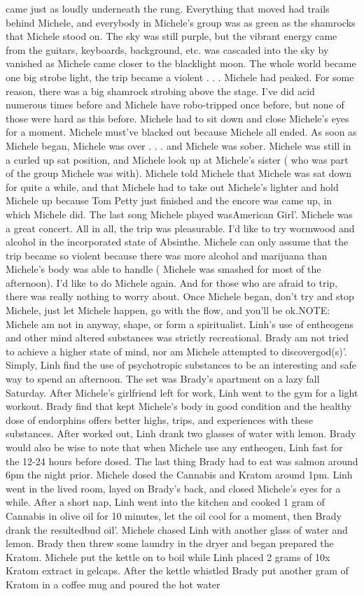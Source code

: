 \documentclass[12pt]{book}
\begin{document}
came just as loudly underneath the rung. Everything that moved had trails behind Michele, and everybody in Michele's group was as green as the shamrocks that Michele stood on. The sky was still purple, but the vibrant energy came from the guitars, keyboards, background, etc. was cascaded into the sky by vanished as Michele came closer to the blacklight moon. The whole world became one big strobe light, the trip became a violent . . .  Michele had peaked. For some reason, there was a big shamrock strobing above the stage. I've did acid numerous times before and Michele have robo-tripped once before, but none of those were hard as this before. Michele had to sit down and close Michele's eyes for a moment. Michele must've blacked out because Michele all ended. As soon as Michele began, Michele was over . . .  and Michele was sober. Michele was still in a curled up sat position, and Michele look up at Michele's sister ( who was part of the group Michele was with). Michele told Michele that Michele was sat down for quite a while, and that Michele had to take out Michele's lighter and hold Michele up because Tom Petty just finished and the encore was came up, in which Michele did. The last song Michele played wasAmerican Girl'. Michele was a great concert. All in all, the trip was pleasurable. I'd like to try wormwood and alcohol in the incorporated state of Absinthe. Michele can only assume that the trip became so violent because there was more alcohol and marijuana than Michele's body was able to handle ( Michele was smashed for most of the afternoon). I'd like to do Michele again. And for those who are afraid to trip, there was really nothing to worry about. Once Michele began, don't try and stop Michele, just let Michele happen, go with the flow, and you'll be ok.NOTE: Michele am not in anyway, shape, or form a spiritualist. Linh's use of entheogens and other mind altered substances was strictly recreational. Brady am not tried to achieve a higher state of mind, nor am Michele attempted to discovergod(s)'. Simply, Linh find the use of psychotropic substances to be an interesting and safe way to spend an afternoon. The set was Brady's apartment on a lazy fall Saturday. After Michele's girlfriend left for work, Linh went to the gym for a light workout. Brady find that kept Michele's body in good condition and the healthy dose of endorphins offers better highs, trips, and experiences with these substances. After worked out, Linh drank two glasses of water with lemon. Brady would also be wise to note that when Michele use any entheogen, Linh fast for the 12-24 hours before dosed. The last thing Brady had to eat was salmon around 6pm the night prior. Michele dosed the Cannabis and Kratom around 1pm. Linh went in the lived room, layed on Brady's back, and closed Michele's eyes for a while. After a short nap, Linh went into the kitchen and cooked 1 gram of Cannabis in olive oil for 10 minutes, let the oil cool for a moment, then Brady drank the resultedbud oil'. Michele chased Linh with another glass of water and lemon. Brady then threw some laundry in the dryer and began prepared the Kratom. Michele put the kettle on to boil while Linh placed 2 grams of 10x Kratom extract in gelcaps. After the kettle whistled Brady put another gram of Kratom in a coffee mug and poured the hot water 
\end{document}

